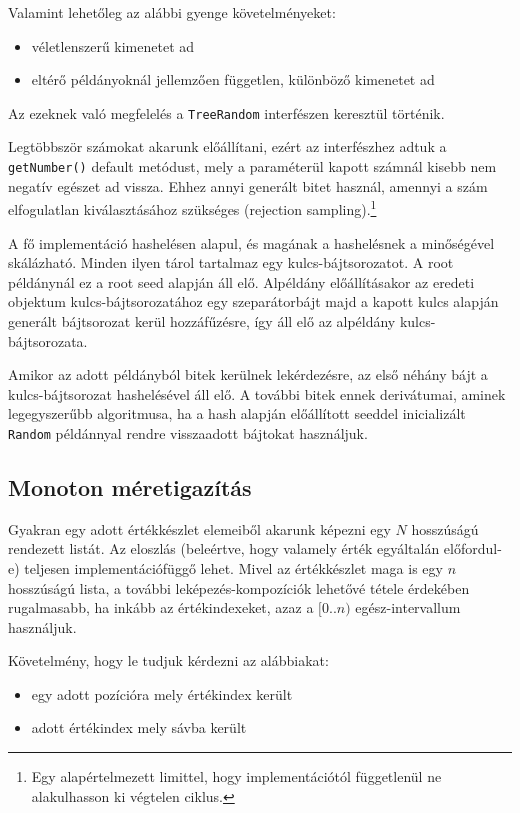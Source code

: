 \documentclass[
    parspace,
    noindent,
    nohyp,
]{elteiktdk}[2023/04/10]
\begin{document}
Valamint lehetőleg az alábbi gyenge követelményeket:

\begin{itemize}
   \item véletlenszerű kimenetet ad
   \item eltérő példányoknál jellemzően független, különböző kimenetet ad
\end{itemize}

Az ezeknek való megfelelés a \texttt{TreeRandom} interfészen keresztül történik.

Legtöbbször számokat akarunk előállítani,
ezért az interfészhez adtuk a \texttt{getNumber()} default metódust,
mely a paraméterül kapott számnál kisebb nem negatív egészet ad vissza.
Ehhez annyi generált bitet használ,
amennyi a szám elfogulatlan kiválasztásához szükséges (rejection sampling).\footnote{
  Egy alapértelmezett limittel, hogy implementációtól függetlenül ne alakulhasson ki végtelen ciklus.
}

A fő implementáció hashelésen alapul, és magának a hashelésnek a minőségével skálázható.
Minden ilyen tárol tartalmaz egy kulcs-bájtsorozatot.
A root példánynál ez a root seed alapján áll elő.
Alpéldány előállításakor az eredeti objektum kulcs-bájtsorozatához egy szeparátorbájt
majd a kapott kulcs alapján generált bájtsorozat kerül hozzáfűzésre,
így áll elő az alpéldány kulcs-bájtsorozata.

Amikor az adott példányból bitek kerülnek lekérdezésre,
az első néhány bájt a kulcs-bájtsorozat hashelésével áll elő.
A további bitek ennek derivátumai, aminek legegyszerűbb algoritmusa,
ha a hash alapján előállított seeddel inicializált \texttt{Random} példánnyal
rendre visszaadott bájtokat használjuk.

\subsection{Monoton méretigazítás}

Gyakran egy adott értékkészlet elemeiből akarunk képezni egy $N$ hosszúságú rendezett listát.
Az eloszlás (beleértve, hogy valamely érték egyáltalán előfordul-e)
teljesen implementációfüggő lehet.
Mivel az értékkészlet maga is egy $n$ hosszúságú lista,
a további leképezés-kompozíciók lehetővé tétele érdekében rugalmasabb,
ha inkább az értékindexeket, azaz a $[0..n)$ egész-intervallum használjuk.

Követelmény, hogy le tudjuk kérdezni az alábbiakat:

\begin{itemize}
    \item egy adott pozícióra mely értékindex került
    \item adott értékindex mely sávba került
\end{itemize}
\end{document}
